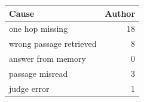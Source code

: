 \begin{tabular}{@{}lr@{}}
\toprule
Cause & Author \\
\midrule
one hop missing & 18 \\
wrong passage retrieved & 8 \\
answer from memory & 0 \\
passage misread & 3 \\
judge error & 1 \\
\bottomrule
\end{tabular}
